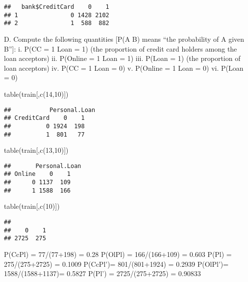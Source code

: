 \documentclass[
]{article}
\newenvironment{Shaded}{\begin{snugshade}}{\end{snugshade}}
\newcommand{\DecValTok}[1]{\textcolor[rgb]{0.00,0.00,0.81}{#1}}
\newcommand{\FunctionTok}[1]{\textcolor[rgb]{0.00,0.00,0.00}{#1}}
\newcommand{\NormalTok}[1]{#1}
\begin{document}
\begin{verbatim}
##   bank$CreditCard    0    1
## 1               0 1428 2102
## 2               1  588  882
\end{verbatim}

D. Compute the following quantities {[}P(A \textbar{} B) means ``the
probability of A given B''{]}: i. P(CC = 1 \textbar{} Loan = 1) (the
proportion of credit card holders among the loan acceptors) ii. P(Online
= 1 \textbar{} Loan = 1) iii. P(Loan = 1) (the proportion of loan
acceptors) iv. P(CC = 1 \textbar{} Loan = 0) v. P(Online = 1 \textbar{}
Loan = 0) vi. P(Loan = 0)

\begin{Shaded}
\begin{Highlighting}[]
\FunctionTok{table}\NormalTok{(train[,}\FunctionTok{c}\NormalTok{(}\DecValTok{14}\NormalTok{,}\DecValTok{10}\NormalTok{)])}
\end{Highlighting}
\end{Shaded}

\begin{verbatim}
##           Personal.Loan
## CreditCard    0    1
##          0 1924  198
##          1  801   77
\end{verbatim}

\begin{Shaded}
\begin{Highlighting}[]
\FunctionTok{table}\NormalTok{(train[,}\FunctionTok{c}\NormalTok{(}\DecValTok{13}\NormalTok{,}\DecValTok{10}\NormalTok{)])}
\end{Highlighting}
\end{Shaded}

\begin{verbatim}
##       Personal.Loan
## Online    0    1
##      0 1137  109
##      1 1588  166
\end{verbatim}

\begin{Shaded}
\begin{Highlighting}[]
\FunctionTok{table}\NormalTok{(train[,}\FunctionTok{c}\NormalTok{(}\DecValTok{10}\NormalTok{)])}
\end{Highlighting}
\end{Shaded}

\begin{verbatim}
## 
##    0    1 
## 2725  275
\end{verbatim}

P(Cc\textbar Pl) = 77/(77+198) = 0.28 P(Ol\textbar Pl) = 166/(166+109) =
0.603 P(Pl) = 275/(275+2725) = 0.1009 P(Cc\textbar Pl')= 801/(801+1924)
= 0.2939 P(Ol\textbar Pl')= 1588/(1588+1137)= 0.5827 P(Pl') =
2725/(275+2725) = 0.90833
\end{document}
